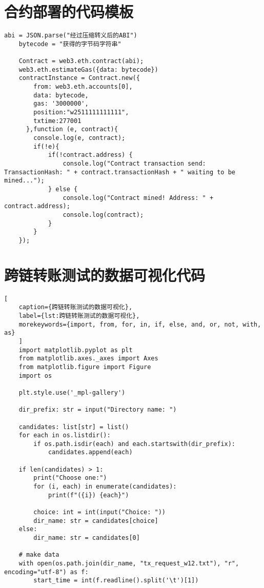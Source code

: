 \begin{appendices}
    \section{合约部署的代码模板}

    \begin{lstlisting}[caption={合约部署代码模板}, label={lst:合约部署代码模板}]
    abi = JSON.parse("经过压缩转义后的ABI")
    bytecode = "获得的字节码字符串"

    Contract = web3.eth.contract(abi);
    web3.eth.estimateGas({data: bytecode})
    contractInstance = Contract.new({
        from: web3.eth.accounts[0],
        data: bytecode,
        gas: '3000000',
        position:"w2511111111111",
        txtime:277001
      },function (e, contract){
        console.log(e, contract);
        if(!e){
            if(!contract.address) {
                console.log("Contract transaction send: TransactionHash: " + contract.transactionHash + " waiting to be mined...");
            } else {
                console.log("Contract mined! Address: " + contract.address);
                console.log(contract);
            }
        }
    });
    \end{lstlisting}

    \section{跨链转账测试的数据可视化代码}
    \begin{lstlisting}[
    caption={跨链转账测试的数据可视化},
    label={lst:跨链转账测试的数据可视化},
    morekeywords={import, from, for, in, if, else, and, or, not, with, as}
    ]
    import matplotlib.pyplot as plt
    from matplotlib.axes._axes import Axes
    from matplotlib.figure import Figure
    import os

    plt.style.use('_mpl-gallery')

    dir_prefix: str = input("Directory name: ")

    candidates: list[str] = list()
    for each in os.listdir():
        if os.path.isdir(each) and each.startswith(dir_prefix):
            candidates.append(each)

    if len(candidates) > 1:
        print("Choose one:")
        for (i, each) in enumerate(candidates):
            print(f"({i}) {each}")

        choice: int = int(input("Choice: "))
        dir_name: str = candidates[choice]
    else:
        dir_name: str = candidates[0]

    # make data
    with open(os.path.join(dir_name, "tx_request_w12.txt"), "r", encoding="utf-8") as f:
        start_time = int(f.readline().split('\t')[1])


\end{lstlisting}
\end{appendices}
